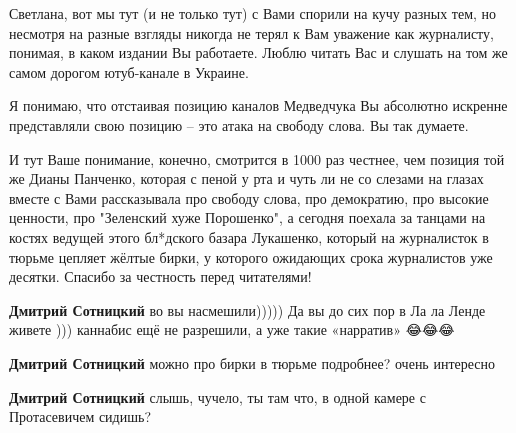 \begin{itemize}
 

Светлана, вот мы тут (и не только тут) с Вами спорили на кучу разных тем, но
несмотря на разные взгляды никогда не терял к Вам уважение как журналисту,
понимая, в каком издании Вы работаете. Люблю читать Вас и слушать на том же
самом дорогом ютуб-канале в Украине. 

Я понимаю, что отстаивая позицию каналов Медведчука Вы абсолютно искренне
представляли свою позицию – это атака на свободу слова. Вы так думаете. 

И тут Ваше понимание, конечно, смотрится в 1000 раз честнее, чем позиция той же
Дианы Панченко, которая с пеной у рта и чуть ли не со слезами на глазах вместе
с Вами рассказывала про свободу слова, про демократию, про высокие ценности,
про "Зеленский хуже Порошенко", а сегодня поехала за танцами на костях ведущей
этого бл*дского базара Лукашенко, который на журналисток в тюрьме цепляет
жёлтые бирки, у которого ожидающих срока журналистов уже десятки. Спасибо за
честность перед читателями!

\begin{itemize}
 
\textbf{Дмитрий Сотницкий} во вы насмешили))))) Да вы до сих пор в Ла ла Ленде живете ))) каннабис ещё не разрешили, а уже такие «нарратив» 😂😂😂

 

\textbf{Дмитрий Сотницкий} можно про бирки в тюрьме подробнее? очень интересно

 
\textbf{Дмитрий Сотницкий} слышь, чучело, ты там что, в одной камере с Протасевичем сидишь?


\end{itemize}
\end{itemize}
